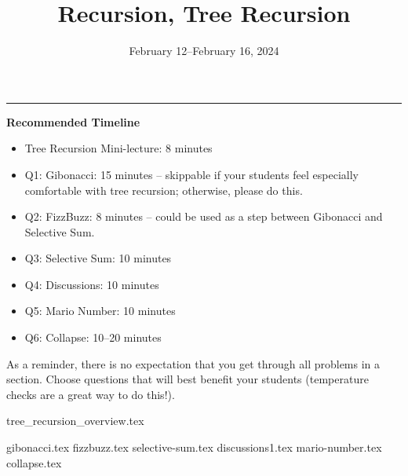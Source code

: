 \documentclass{exam}
\title{Recursion, Tree Recursion}
\date{February 12--February 16, 2024}
\begin{document}
\maketitle
\rule{\textwidth}{0.15em}
\fontsize{12}{15}\selectfont

\begin{meta}
\textbf{Recommended Timeline}
\begin{itemize}
    \item Tree Recursion Mini-lecture: 8 minutes
    \item Q1: Gibonacci: 15 minutes -- skippable if your students feel especially comfortable with tree recursion; otherwise, please do this.
    \item Q2: FizzBuzz: 8 minutes -- could be used as a step between Gibonacci and Selective Sum.
    \item Q3: Selective Sum: 10 minutes
    \item Q4: Discussions: 10 minutes
    \item Q5: Mario Number: 10 minutes
    \item Q6: Collapse: 10--20 minutes
\end{itemize}
As a reminder, there is no expectation that you get through all problems in a section. Choose questions that will best benefit your students (temperature checks are a great way to do this!).
\end{meta}

{tree_recursion_overview.tex}
\begin{questions}
    {gibonacci.tex}
    {fizzbuzz.tex}
    {selective-sum.tex}
    {discussions1.tex} 
    {mario-number.tex}
    {collapse.tex}
\end{questions}
\end{document}
